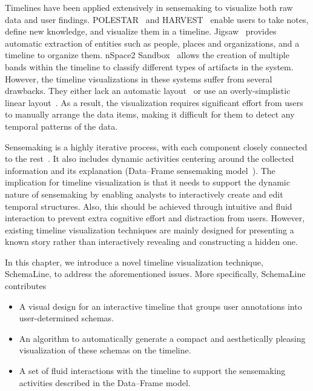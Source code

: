 Timelines have been applied extensively in sensemaking to visualize both raw data and user findings. POLESTAR~\cite{Pioch2006} and HARVEST~\cite{Gotz2006} enable users to take notes, define new knowledge, and visualize them in a timeline. Jigsaw~\cite{Gorg2013} provides automatic extraction of entities such as people, places and organizations, and a timeline to organize them. nSpace2 Sandbox~\cite{SandboxTimeline2012} allows the creation of multiple bands within the timeline to classify different types of artifacts in the system. However, the timeline visualizations in these systems suffer from several drawbacks. They either lack an automatic layout~\cite{Pioch2006} or use an overly-simplistic linear layout~\cite{SandboxTimeline2012}. As a result, the visualization requires significant effort from users to manually arrange the data items, making it difficult for them to detect any temporal patterns of the data.

Sensemaking is a highly iterative process, with each component closely connected to the rest~\cite{Pirolli2005}. It also includes dynamic activities centering around the collected information and its explanation (Data--Frame sensemaking model~\cite{Klein2003}). The implication for timeline visualization is that it needs to support the dynamic nature of sensemaking by enabling analysts to interactively create and edit temporal structures. Also, this should be achieved through intuitive and fluid interaction to prevent extra cognitive effort and distraction from users. However, existing timeline visualization techniques are mainly designed for presenting a known story rather than interactively revealing and constructing a hidden one.

In this chapter, we introduce a novel timeline visualization technique, SchemaLine, to address the aforementioned issues. More specifically, SchemaLine contributes
\begin{itemize}
	\item A visual design for an interactive timeline that groups user annotations into user-determined schemas.
	\item An algorithm to automatically generate a compact and aesthetically pleasing visualization of these schemas on the timeline.
	\item A set of fluid interactions with the timeline to support the sensemaking activities described in the Data--Frame model.
\end{itemize}
